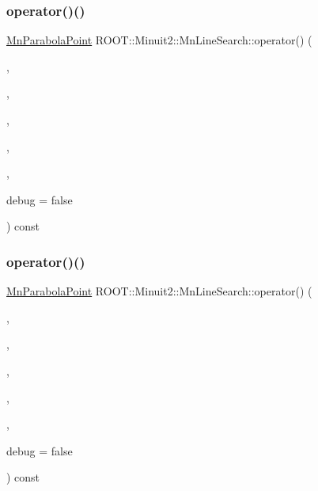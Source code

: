 \subsubsection{\texorpdfstring{operator()()}{operator()()}\hspace{0.1cm}{\footnotesize\ttfamily [2/3]}}
{\footnotesize\ttfamily \mbox{\hyperlink{classROOT_1_1Minuit2_1_1MnParabolaPoint}{Mn\+Parabola\+Point}} R\+O\+O\+T\+::\+Minuit2\+::\+Mn\+Line\+Search\+::operator() (\begin{DoxyParamCaption}\item[{const \mbox{\hyperlink{classROOT_1_1Minuit2_1_1MnFcn}{Mn\+Fcn}} \&}]{,  }\item[{const \mbox{\hyperlink{classROOT_1_1Minuit2_1_1MinimumParameters}{Minimum\+Parameters}} \&}]{,  }\item[{const \mbox{\hyperlink{namespaceROOT_1_1Minuit2_a62ed97730a1ca8d3fbaec64a19aa11c9}{Mn\+Algebraic\+Vector}} \&}]{,  }\item[{double}]{,  }\item[{const \mbox{\hyperlink{classROOT_1_1Minuit2_1_1MnMachinePrecision}{Mn\+Machine\+Precision}} \&}]{,  }\item[{bool}]{debug = {\ttfamily false} }\end{DoxyParamCaption}) const}

\mbox{\label{classROOT_1_1Minuit2_1_1MnLineSearch_a4caf80e70d50f3bfa149d28836d26a95}} 
\subsubsection{\texorpdfstring{operator()()}{operator()()}\hspace{0.1cm}{\footnotesize\ttfamily [3/3]}}
{\footnotesize\ttfamily \mbox{\hyperlink{classROOT_1_1Minuit2_1_1MnParabolaPoint}{Mn\+Parabola\+Point}} R\+O\+O\+T\+::\+Minuit2\+::\+Mn\+Line\+Search\+::operator() (\begin{DoxyParamCaption}\item[{const \mbox{\hyperlink{classROOT_1_1Minuit2_1_1MnFcn}{Mn\+Fcn}} \&}]{,  }\item[{const \mbox{\hyperlink{classROOT_1_1Minuit2_1_1MinimumParameters}{Minimum\+Parameters}} \&}]{,  }\item[{const \mbox{\hyperlink{namespaceROOT_1_1Minuit2_a62ed97730a1ca8d3fbaec64a19aa11c9}{Mn\+Algebraic\+Vector}} \&}]{,  }\item[{double}]{,  }\item[{const \mbox{\hyperlink{classROOT_1_1Minuit2_1_1MnMachinePrecision}{Mn\+Machine\+Precision}} \&}]{,  }\item[{bool}]{debug = {\ttfamily false} }\end{DoxyParamCaption}) const}



